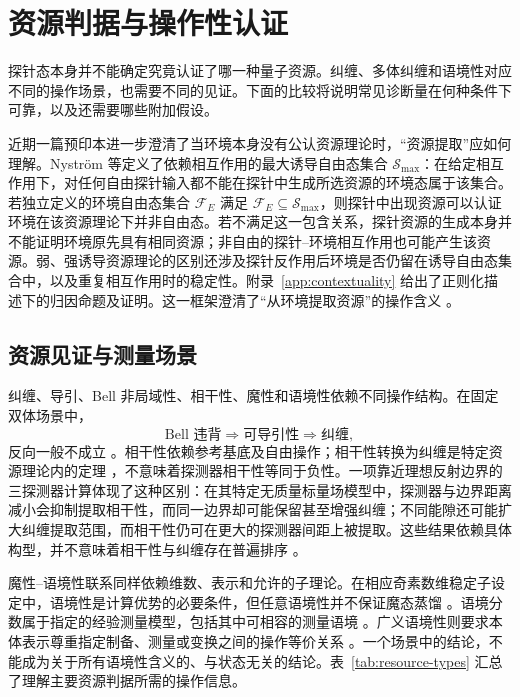 \documentclass[UTF8,11pt,a4paper,fontset=none]{ctexart}
\begin{document}
\section{资源判据与操作性认证}
\label{sec:resources}
探针态本身并不能确定究竟认证了哪一种量子资源。纠缠、多体纠缠和语境性对应不同的操作场景，也需要不同的见证。下面的比较将说明常见诊断量在何种条件下可靠，以及还需要哪些附加假设。

近期一篇预印本进一步澄清了当环境本身没有公认资源理论时，“资源提取”应如何理解。Nyström 等定义了依赖相互作用的最大诱导自由态集合 $\mathcal S_{\max}$：在给定相互作用下，对任何自由探针输入都不能在探针中生成所选资源的环境态属于该集合。若独立定义的环境自由态集合 $\mathcal F_E$ 满足 $\mathcal F_E\subseteq\mathcal S_{\max}$，则探针中出现资源可以认证环境在该资源理论下并非自由态。若不满足这一包含关系，探针资源的生成本身并不能证明环境原先具有相同资源；非自由的探针–环境相互作用也可能产生该资源。弱、强诱导资源理论的区别还涉及探针反作用后环境是否仍留在诱导自由态集合中，以及重复相互作用时的稳定性。附录~\ref{app:contextuality} 给出了正则化描述下的归因命题及证明。这一框架澄清了“从环境提取资源”的操作含义 \cite{Nystrom2026Induced}。

\subsection{资源见证与测量场景}
纠缠、导引、Bell 非局域性、相干性、魔性和语境性依赖不同操作结构。在固定双体场景中，
\begin{equation}
\text{Bell 违背}\Longrightarrow\text{可导引性}\Longrightarrow\text{纠缠},
\label{eq:resource-implication-chain}
\end{equation}
反向一般不成立 \cite{Bell1964,ClauserHorneShimonyHolt1969,WisemanJonesDoherty2007,Uola2020}。相干性依赖参考基底及自由操作；相干性转换为纠缠是特定资源理论内的定理 \cite{BaumgratzCramerPlenio2014,WinterYang2016,Streltsov2015,StreltsovAdessoPlenio2017}，不意味着探测器相干性等同于负性。一项靠近理想反射边界的三探测器计算体现了这种区别：在其特定无质量标量场模型中，探测器与边界距离减小会抑制提取相干性，而同一边界却可能保留甚至增强纠缠；不同能隙还可能扩大纠缠提取范围，而相干性仍可在更大的探测器间距上被提取。这些结果依赖具体构型，并不意味着相干性与纠缠存在普遍排序 \cite{WuReflectingBoundary2026}。

魔性--语境性联系同样依赖维数、表示和允许的子理论。在相应奇素数维稳定子设定中，语境性是计算优势的必要条件，但任意语境性并不保证魔态蒸馏 \cite{Howard2014,VeitchEtAl2014,Schmid2022}。语境分数属于指定的经验测量模型，包括其中可相容的测量语境 \cite{AbramskyBrandenburger2011,AbramskyBarbosaMansfield2017}。广义语境性则要求本体表示尊重指定制备、测量或变换之间的操作等价关系 \cite{Spekkens2005}。一个场景中的结论，不能成为关于所有语境性含义的、与状态无关的结论。表~\ref{tab:resource-types} 汇总了理解主要资源判据所需的操作信息。
\end{document}
